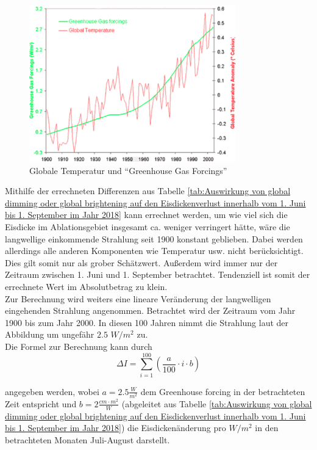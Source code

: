 \documentclass[11pt,a4paper]{article}
\begin{document}
\begin{figure}[H]
\centering
\includegraphics[width=0.8\textwidth]{pictures/greenhouse_gas_forcing.png}
\caption[Globale Temperatur und ``Greenhouse Gas Forcings'']{Globale Temperatur und ``Greenhouse Gas Forcings'' \parencite{GreenhouseGasForcing}}
\label{Globale Temperatur und ``Greenhouse Gas Forcings''}
\end{figure}


Mithilfe der errechneten Differenzen aus Tabelle \ref{tab:Auswirkung von global dimming oder global brightening auf den Eisdickenverlust innerhalb vom 1. Juni bis 1. September im Jahr 2018} kann errechnet werden, um wie viel sich die Eisdicke im Ablationsgebiet insgesamt ca. weniger verringert hätte, wäre die langwellige einkommende Strahlung seit 1900 konstant geblieben. Dabei werden allerdings alle anderen Komponenten wie Temperatur usw. nicht berücksichtigt. Dies gilt somit nur als grober Schätzwert. Außerdem wird immer nur der Zeitraum zwischen 1. Juni und 1. September betrachtet. Tendenziell ist somit der errechnete Wert im Absolutbetrag zu klein.\\

Zur Berechnung wird weiters eine lineare Veränderung der langwelligen eingehenden Strahlung angenommen. Betrachtet wird der Zeitraum vom Jahr 1900 bis zum Jahr 2000. In diesen 100 Jahren nimmt die Strahlung laut der Abbildung um ungefähr $2.5$ $W/m^2$ zu.\\

Die Formel zur Berechnung kann durch
\begin{equation}
\Delta I =\sum_{i=1}^{100}\left ( \frac{a}{100}\cdot i \cdot b \right )
\end{equation}

angegeben werden, wobei $a=2.5\frac{W}{m^2}$ dem Greenhouse forcing in der betrachteten Zeit entspricht und $b=2 \frac{cm \cdot m^2}{W}$ (abgeleitet aus Tabelle \ref{tab:Auswirkung von global dimming oder global brightening auf den Eisdickenverlust innerhalb vom 1. Juni bis 1. September im Jahr 2018}) die Eisdickenänderung pro $W/m^2$ in den betrachteten Monaten Juli-August darstellt.\\
\end{document}
